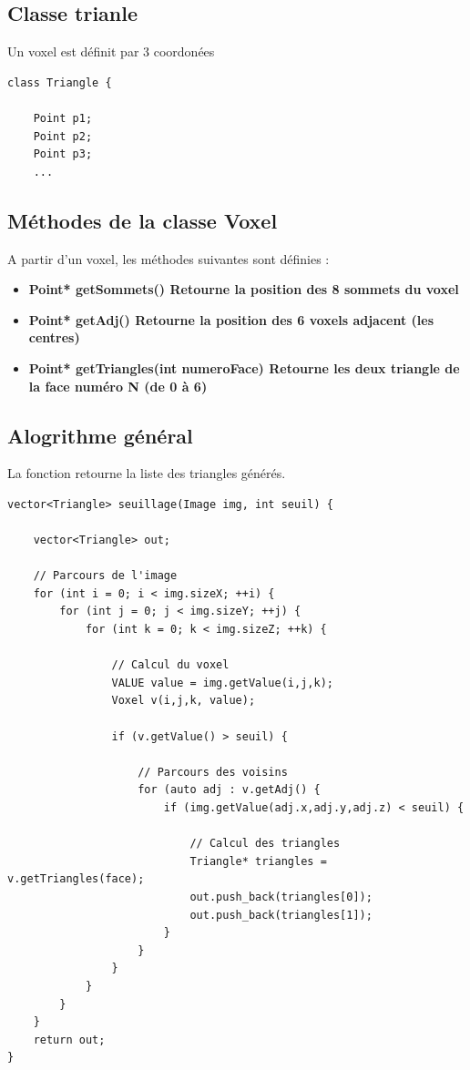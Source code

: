\documentclass[a4paper,11pt]{article}
\begin{document}
\subsection{Classe trianle}

Un voxel est définit par 3 coordonées

\begin{lstlisting}
class Triangle {
	
	Point p1;
	Point p2;
	Point p3;
	...
\end{lstlisting}

\subsection{Méthodes de la classe Voxel}

A partir d'un voxel, les méthodes suivantes sont définies :

\begin{itemize}
\item \bf{Point* getSommets()} Retourne la position des 8 sommets du voxel
\item \bf{Point* getAdj()} Retourne la position des 6 voxels adjacent (les centres)
\item \bf{Point* getTriangles(int numeroFace)} Retourne les deux triangle de la face numéro N (de 0 à 6)
\end{itemize}

\subsection{Alogrithme général}

La fonction retourne la liste des triangles générés.

\begin{lstlisting}
vector<Triangle> seuillage(Image img, int seuil) {

	vector<Triangle> out;

	// Parcours de l'image
	for (int i = 0; i < img.sizeX; ++i) {
		for (int j = 0; j < img.sizeY; ++j) {
			for (int k = 0; k < img.sizeZ; ++k) {

				// Calcul du voxel
				VALUE value = img.getValue(i,j,k);
				Voxel v(i,j,k, value);

				if (v.getValue() > seuil) {

					// Parcours des voisins
					for (auto adj : v.getAdj() {
						if (img.getValue(adj.x,adj.y,adj.z) < seuil) {

							// Calcul des triangles
							Triangle* triangles = v.getTriangles(face);
							out.push_back(triangles[0]);
							out.push_back(triangles[1]);
						}
					}
				}
			}
		}
	}
	return out;
}

\end{lstlisting}
\end{document}
